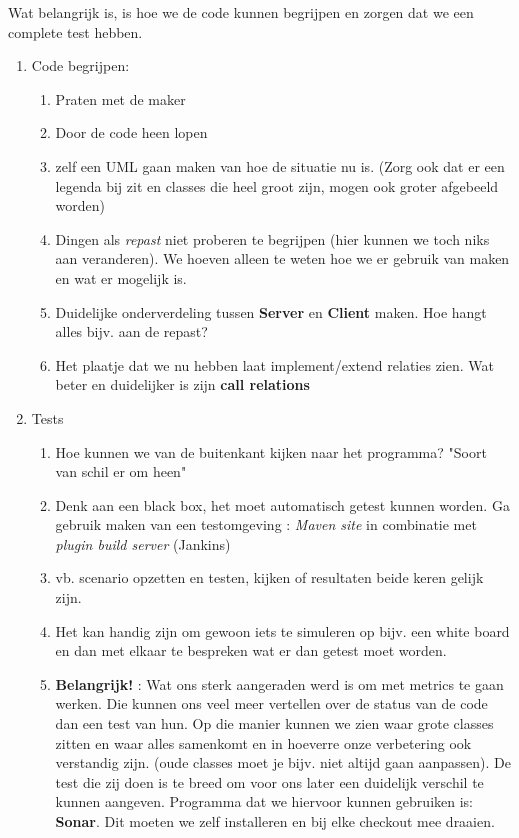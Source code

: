 \documentclass{article}
\begin{document}
\begin{enumerate}
Wat belangrijk is, is hoe we de code kunnen begrijpen en zorgen dat we een complete test hebben. 
	\begin{enumerate}
		\item Code begrijpen: 
		\begin{enumerate}
			\item Praten met de maker
			\item Door de code heen lopen
			\item zelf een UML gaan maken van hoe de situatie nu is. (Zorg ook dat er een legenda bij zit en classes die heel groot zijn, mogen ook groter afgebeeld worden)  
			\item Dingen als \emph{repast} niet proberen te begrijpen (hier kunnen we toch niks aan veranderen). We hoeven alleen te weten hoe we er gebruik van maken en wat er mogelijk is. 
			\item Duidelijke onderverdeling tussen \textbf{Server} en \textbf{Client} maken. Hoe hangt alles bijv. aan de repast? 
			\item Het plaatje dat we nu hebben laat implement/extend relaties zien. Wat beter en duidelijker is zijn \textbf{call relations}
		\end{enumerate}
		\item Tests 
		\begin{enumerate}
			\item	 Hoe kunnen we van de buitenkant kijken naar het programma? "Soort van schil er om heen" 
		\item Denk aan een black box, het moet automatisch getest kunnen worden. Ga gebruik maken van een testomgeving : \emph{Maven site} in combinatie met \emph{plugin build server} (Jankins) 
		\item vb. scenario opzetten en testen, kijken of resultaten beide keren gelijk zijn. 
		\item Het kan handig zijn om gewoon iets te simuleren op bijv. een white board en dan met elkaar te bespreken wat er dan getest moet worden. 
		\item \textbf{Belangrijk!} : Wat ons sterk aangeraden werd is om met metrics te gaan werken. Die kunnen ons veel meer vertellen over de status van de code dan een test van hun. Op die manier kunnen we zien waar grote classes zitten en waar alles samenkomt en in hoeverre onze verbetering ook verstandig zijn. (oude classes moet je bijv. niet altijd gaan aanpassen). De test die zij doen is te breed om voor ons later een duidelijk verschil te kunnen aangeven. Programma dat we hiervoor kunnen gebruiken is: \textbf{Sonar}. Dit moeten we zelf installeren en bij elke checkout mee draaien. 
		\end{enumerate}
	
	\end{enumerate}
\end{enumerate}
\end{document}

